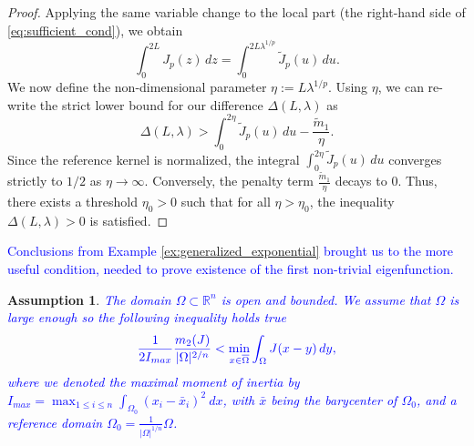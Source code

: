 \documentclass[12pt, a4paper]{article}
\newcommand{\revision}[1]{\textcolor{blue}{#1}}
\theoremstyle{break}
\theoremstyle{break}
\theoremstyle{break}
\newtheorem{asm}{Assumption}[section]
\theoremstyle{break}
\theoremstyle{break}
\theoremstyle{break}
\theoremstyle{break}
\theoremstyle{break}
\theoremstyle{break}
\begin{document}
\begin{proof}
    Applying the same variable change to the local part (the right-hand side of \eqref{eq:sufficient_cond}), we obtain
    \begin{equation*}
        \int_0^{2L} J_p(z) \, dz = \int_0^{2 L \lambda^{1/p}} \tilde{J}_p(u) \, du.
    \end{equation*}
    We now define the non-dimensional parameter $\eta := L \lambda^{1/p}$. Using $\eta$, we can re-write the strict lower bound for our difference $\Delta(L, \lambda)$ as
    \begin{equation*}
        \Delta(L, \lambda) > \int_0^{2\eta} \tilde{J}_p(u) \, du - \frac{ \tilde{m}_1}{\eta}.
    \end{equation*}
    Since the reference kernel is normalized, the integral $\int_0^{2\eta} \tilde{J}_p(u) \, du$ converges strictly to $1/2$ as $\eta \to \infty$. Conversely, the penalty term $\frac{\tilde{m}_1}{\eta}$ decays to $0$. Thus, there exists a threshold $\eta_0 > 0$ such that for all $\eta > \eta_0$, the inequality $\Delta(L, \lambda) > 0$ is satisfied. 
\end{proof}

\revision{Conclusions from Example \ref{ex:generalized_exponential} brought us to the more useful condition, needed to prove existence of the first non-trivial eigenfunction.}
\begin{asm}
    \label{asm:DomainProperties_2}
    \revision{The domain $\Omega \subset \mathbb{R}^n$ is open and bounded. We assume that $\Omega$ is large enough so the following inequality holds true}
    \begin{equation} \label{eq:variance_condition}
        \revision{\frac{1}{2 I_{max}} \frac{m_2(J)}{|\Omega|^{2/n}} < \min_{x \in \overline{\Omega}} \int_\Omega J(x-y) \, dy,}
    \end{equation}
    \revision{where we denoted the maximal moment of inertia by $I_{max} = \max_{1\leq i \leq n} \int_{\Omega_0} (x_i - \bar{x}_i)^2 \:dx$, with $\bar{x}$ being the barycenter of $\Omega_0$, and a reference domain $\Omega_0 = \frac{1}{|\Omega|^{1/n}}\Omega$.}
\end{asm}
\end{document}
